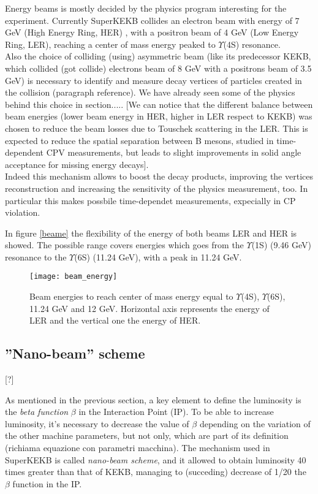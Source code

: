 Energy beams is mostly decided by the physics program interesting for the experiment. Currently SuperKEKB collides an electron beam with energy of 7 GeV (High Energy Ring, HER) , with a positron beam of 4 GeV (Low Energy Ring, LER), reaching a center of mass energy peaked to $\Upsilon$(4S) resonance.\\
Also the choice of colliding (using) asymmetric beam (like its predecessor KEKB, which collided (got collide) electrons beam of 8 GeV with a positrons beam of 3.5 GeV) is necessary to identify and measure decay vertices of particles created in the collision (paragraph reference). We have already seen some of the physics behind this choice in section..... [We can notice that the different balance between beam energies (lower beam energy in HER, higher in LER respect to KEKB) was chosen to reduce the beam losses due to Touschek scattering in the LER. This is expected to reduce the spatial separation between B mesons, studied in time-dependent CPV measurements, but leads to slight improvements in solid angle acceptance for missing energy decays].\\
Indeed this mechanism allows to boost the decay products, improving the vertices reconstruction and increasing the sensitivity of the physics measurement, too. In particular this makes possbile time-dependet measurements, expecially in CP violation.


In figure \vref{beame} the flexibility of the energy of both beams LER and HER is showed. The possible range covers energies which goes from the $\Upsilon$(1S) (9.46 GeV) resonance to the $\Upsilon$(6S) (11.24 GeV), with a peak in 11.24 GeV.

\begin{figure}
\centering
\texttt{[image: beam\_energy]}
\caption{Beam energies to reach center of mass energy equal to $\Upsilon$(4S), $\Upsilon$(6S), 11.24 GeV and 12 GeV. Horizontal axis represents the energy of LER and the vertical one the energy of HER. }
\label{fig:beame}
\end{figure}



\subsection{''Nano-beam'' scheme} [?]

As mentioned in the previous section, a key element to define the luminosity is the \textit{beta function} $\beta$ in the Interaction Point (IP). To be able to increase luminosity, it's necessary to decrease the value of $\beta$ depending on the variation of the other machine parameters, but not only, which are part of its definition (richiama equazione con parametri macchina).
The mechanism used in SuperKEKB is called \textit{nano-beam scheme}, and it allowed to obtain luminosity 40 times greater than that of KEKB, managing to (succeding) decrease of 1/20 the $\beta$ function in the IP.

